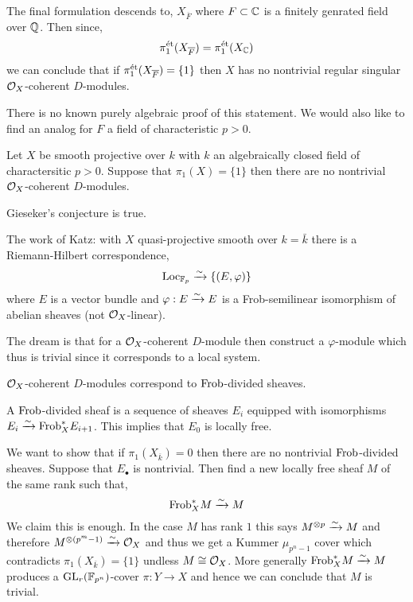 \documentclass[12pt]{article}
\begin{document}
The final formulation descends to,
$X_{\overline{F}}$ where $F \subset \mathbb{C}$ is a finitely genrated field over $\mathbb{Q}$. Then since,
\[ \pi_1^{\text{\'{e}t}}(X_{\overline{F}}) = \pi_1^{\text{\'{e}t}}(X_{\mathbb{C}}) \]
we can conclude that if $\pi_1^{\text{\'{e}t}}(X_{\overline{F}}) = \{ 1 \}$ then $X$ has no nontrivial regular singular $\mathcal{O}_{X}$-coherent $D$-modules.

\begin{rmk}
There is no known purely algebraic proof of this statement. We would also like to find an analog for $F$ a field of characteristic $p > 0$. 
\end{rmk}

\begin{conj}[Gieseker, 1975]
Let $X$ be smooth projective over $k$ with $k$ an algebraically closed field of charactersitic $p > 0$. Suppose that $\pi_1(X) = \{ 1 \}$ then there are no nontrivial $\mathcal{O}_{X}$-coherent $D$-modules. 
\end{conj}

\begin{theorem}[E-Mehta, 2010]
Gieseker's conjecture is true. 
\end{theorem}

\begin{rmk}
The work of Katz: with $X$ quasi-projective smooth over $k = \bar{k}$ there is a Riemann-Hilbert correspondence,
\[ \mathrm{Loc}_{\mathbb{F}_p} \xrightarrow{\sim} \{ (E, \varphi) \} \]
where $E$ is a vector bundle and $\varphi : E \xrightarrow{\sim} E$ is a Frob-semilinear isomorphism of abelian sheaves (not $\mathcal{O}_{X}$-linear). 
\end{rmk}

\begin{rmk}
The dream is that for a $\mathcal{O}_{X}$-coherent $D$-module then construct a $\varphi$-module which thus is trivial since it corresponds to a local system. 
\end{rmk}

\begin{prop}
$\mathcal{O}_{X}$-coherent $D$-modules correspond to $\mathrm{Frob}$-divided sheaves.
\end{prop}

\begin{rmk}
A $\mathrm{Frob}$-divided sheaf is a sequence of sheaves $E_i$ equipped with isomorphisms $E_i \xrightarrow{\sim} \mathrm{Frob}^*_X E_{i+1}$. This implies that $E_0$ is locally free. 
\end{rmk}

\begin{rmk}
We want to show that if $\pi_1(X_{\overline{k}}) = 0$ then there are no nontrivial $\mathrm{Frob}$-divided sheaves. Suppose that $E_\bullet$ is nontrivial. Then find a new locally free sheaf $M$ of the same rank such that,
\[ \mathrm{Frob}_X^* M \xrightarrow{\sim} M \]
We claim this is enough. In the case $M$ has rank $1$ this says $M^{\otimes p} \xrightarrow{\sim} M$ and therefore $M^{\otimes (p^m - 1)} \xrightarrow{\sim} \mathcal{O}_{X}$ and thus we get a Kummer $\mu_{p^{n}-1}$ cover which contradicts $\pi_1(X_{\overline{k}}) = \{ 1 \}$ undless $M \cong \mathcal{O}_{X}$. More generally $\mathrm{Frob}_X^* M \xrightarrow{\sim} M$ produces a $\mathrm{GL}_r(\mathbb{F}_{p^n})$-cover $\pi : Y \to X$ and hence we can conclude that $M$ is trivial.
\end{rmk}
\end{document}
